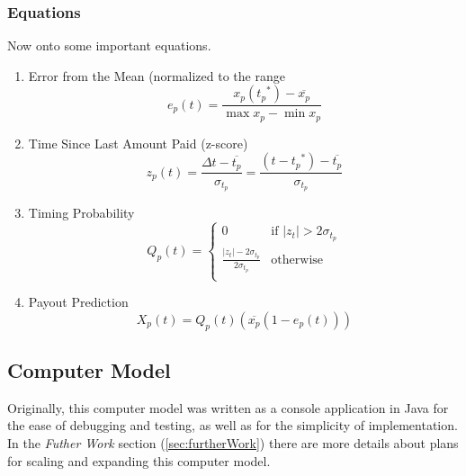 \documentclass[12pt,letterpaper,titlepage]{article}
\begin{document}
				
			\subsubsection{Equations} Now onto some important equations.
			
				\begin{enumerate}
					\item{Error from the Mean (normalized to the range} 
						\begin{equation} \label{eq:efmEq}
							e_p(t) = \frac{x_p({t_p}^*) - \overline{x_p}}{\max{x_p} - \min{x_p}}
						\end{equation}
						
					\item{Time Since Last Amount Paid (z-score)}
						\begin{equation} \label{eq:tZscoreEq}
							z_p(t) = \frac{\Delta{t} - \overline{t_p}}{\sigma_{t_p}} = \frac{(t - {t_{p}}^*) - \overline{t_p}}{\sigma_{t_p}}
						\end{equation}
						
					\item{Timing Probability} 
						\begin{equation} \label{eq:timeProbEq}
							Q_p(t) = 
							\begin{cases}
								0	
									& \text{if $|z_t| > 2 \sigma_{t_p}$} \\
							
								\frac{|z_t| - 2 \sigma_{t_p}}{2 \sigma_{t_p}} 									
									& \text{otherwise} \\
							
							\end{cases}
						\end{equation}
						
					\item{Payout Prediction}
						\begin{equation} \label{eq:predEq}
							X_p(t) = Q_p(t) (\overline{x_p} (1 - e_p(t)))
						\end{equation}
				\end{enumerate}
								
		\subsection{Computer Model}
		Originally, this computer model was written as a console application in Java\texttrademark \; for the ease of debugging and testing, as well as for the simplicity of implementation. In the \emph{Futher Work} section (\ref{sec:furtherWork}) there are more details about plans for scaling and expanding this computer model.
			
\end{document}
